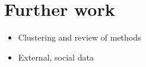 \section{Further work}

\begin{itemize}
    \item Clustering and review of methods
    \item External, social data
\end{itemize}
